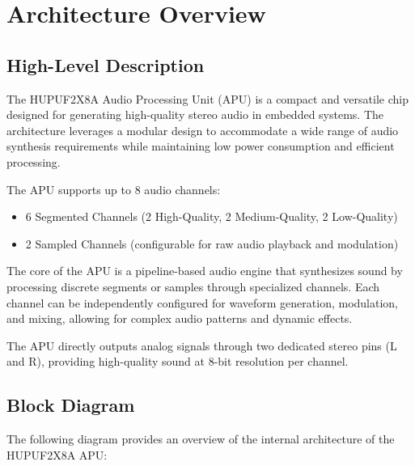 \section{Architecture Overview}

\subsection{High-Level Description}
The HUPUF2X8A Audio Processing Unit (APU) is a compact and versatile chip designed for generating high-quality stereo audio in embedded systems. The architecture leverages a modular design to accommodate a wide range of audio synthesis requirements while maintaining low power consumption and efficient processing.

The APU supports up to 8 audio channels: 
\begin{itemize}
    \item 6 Segmented Channels (2 High-Quality, 2 Medium-Quality, 2 Low-Quality)
    \item 2 Sampled Channels (configurable for raw audio playback and modulation)
\end{itemize}

The core of the APU is a pipeline-based audio engine that synthesizes sound by processing discrete segments or samples through specialized channels. Each channel can be independently configured for waveform generation, modulation, and mixing, allowing for complex audio patterns and dynamic effects.

The APU directly outputs analog signals through two dedicated stereo pins (L and R), providing high-quality sound at 8-bit resolution per channel.

\subsection{Block Diagram}
The following diagram provides an overview of the internal architecture of the HUPUF2X8A APU:

